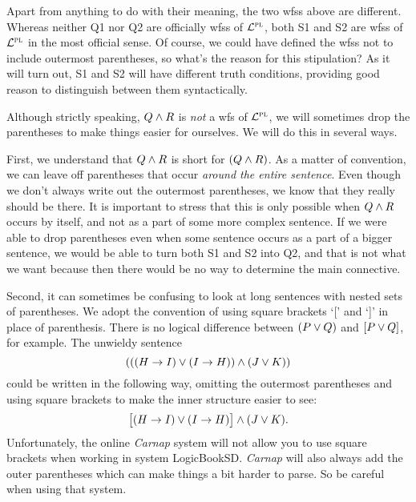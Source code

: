 Apart from anything to do with their meaning, the two wfss above are different.
Whereas neither Q1 nor Q2 are officially wfss of $\mathcal{L}^{\textsc{pl}}$, both S1 and S2 are wfss of $\mathcal{L}^{\textsc{pl}}$ in the most official sense.
Of course, we could have defined the wfss not to include outermost parentheses, so what's the reason for this stipulation?
As it will turn out, S1 and S2 will have different truth conditions, providing good reason to distinguish between them syntactically.

Although strictly speaking, $Q \wedge R$ is \emph{not} a wfs of $\mathcal{L}^{\textsc{pl}}$, we will sometimes drop the parentheses to make things easier for ourselves.
We will do this in several ways.

First, we understand that $Q \wedge R$ is short for $(Q \wedge R)$.
As a matter of convention, we can leave off parentheses that occur \emph{around the entire sentence}.
Even though we don't always write out the outermost parentheses, we know that they really should be there.
It is important to stress that this is only possible when $Q \wedge R$ occurs by itself, and not as a part of some more complex sentence. 
If we were able to drop parentheses even when some sentence occurs as a part of a bigger sentence, we would be able to turn both S1 and S2 into Q2, and that is not what we want because then there would be no way to determine the main connective.

Second, it can sometimes be confusing to look at long sentences with nested sets of parentheses.
We adopt the convention of using square brackets `[' and `]' in place of parenthesis.
There is no logical difference between $(P\vee Q)$ and $[P\vee Q]$, for example.
The unwieldy sentence
  $$(((H \rightarrow I) \vee (I \rightarrow H)) \wedge (J \vee K))$$
could be written in the following way, omitting the outermost parentheses and using square brackets to make the inner structure easier to see:
  $$\bigl[(H \rightarrow I) \vee (I \rightarrow H)\bigr] \wedge (J \vee K).$$
Unfortunately, the online \textit{Carnap} system will not allow you to use square brackets when working in system LogicBookSD.
\textit{Carnap} will also always add the outer parentheses which can make things a bit harder to parse.
So be careful when using that system.

